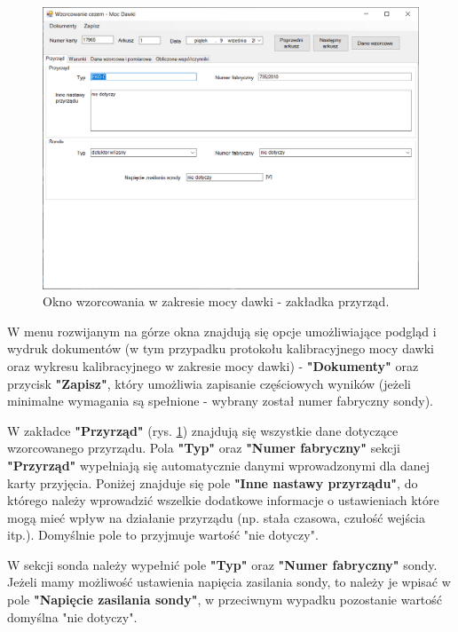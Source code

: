 \begin{figure}[htb]
	\centering
	\includegraphics[width=\columnwidth]{obrazki/Wzorcowanie/moc_dawki/przyrzad.png}
	\caption{Okno wzorcowania w zakresie mocy dawki - zakładka przyrząd.}
	\label{mocPrzyrzad}
\end{figure}

W menu rozwijanym na górze okna znajdują się opcje umożliwiające podgląd i wydruk dokumentów (w tym przypadku protokołu kalibracyjnego mocy dawki oraz wykresu kalibracyjnego w zakresie mocy dawki) - \textbf{"Dokumenty"} oraz przycisk \textbf{"Zapisz"}, który umożliwia zapisanie częściowych wyników (jeżeli minimalne wymagania są spełnione - wybrany został numer fabryczny sondy).

W zakładce \textbf{"Przyrząd"} (rys. \ref{mocPrzyrzad}) znajdują się wszystkie dane dotyczące wzorcowanego przyrządu. Pola \textbf{"Typ"} oraz \textbf{"Numer fabryczny"} sekcji \textbf{"Przyrząd"} wypełniają się automatycznie danymi wprowadzonymi dla danej karty przyjęcia. Poniżej znajduje się pole \textbf{"Inne nastawy przyrządu"}, do którego należy wprowadzić wszelkie dodatkowe informacje o ustawieniach które mogą mieć wpływ na działanie przyrządu (np. stała czasowa, czułość wejścia itp.). Domyślnie pole to przyjmuje wartość "nie dotyczy".
	
W sekcji sonda należy wypełnić pole \textbf{"Typ"} oraz \textbf{"Numer fabryczny"} sondy. Jeżeli mamy możliwość ustawienia napięcia zasilania sondy, to należy je wpisać w pole \textbf{"Napięcie zasilania sondy"}, w przeciwnym wypadku pozostanie wartość domyślna "nie dotyczy".

